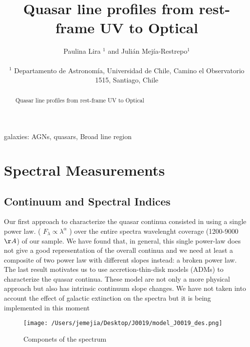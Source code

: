 \documentclass[usenatbib]{mn2e}
\begin{document}
\title[Quasar line profiles from  rest-frame UV to Optical]{Quasar line profiles from rest-frame UV to Optical}    
\author[P. Lira and J.E. Mejia-Restrepo]{
\parbox[t]{\textwidth}{\raggedright 
Paulina Lira $^{1}$ and
Juli\'an Mej\'ia-Restrepo$^{1}$ 
}
\vspace*{6pt}\\
$^{1}$ Departamento de Astronom\'{i}a, Universidad de Chile, Camino el
Observatorio 1515, Santiago, Chile} 

\maketitle

\begin{abstract}
 Quasar line profiles from  rest-frame UV to Optical 
\end{abstract}

\begin{keywords}
{galaxies: AGNs, quasars, Broad line region} 
\end{keywords}


\section{Spectral Measurements}

\subsection{Continuum and Spectral Indices}

Our first approach to characterize the quasar continua consisted in using a single power law. ( $F_{\lambda} \propto \lambda^{\alpha}$ ) over the entire spectra wavelenght coverage (1200-9000$\AA$) of our sample. We have found that, in general, this single power-law does not give a good representation of the overall continua and we need  at least a composite of two power law with different slopes instead: a broken power law.
The last result motivates us to use accretion-thin-disk models (ADMs) to  characterize the quasar continua.  These model are not only a more physical approach but also has intrinsic continuum slope changes. We have not taken into account the effect of galactic extinction on the spectra but it is being implemented in this moment

\begin{figure*}
\begin{center}
\texttt{[image: /Users/jemejia/Desktop/J0019/model\_J0019\_des.png]}
\vspace{5mm}
\end{center} 
\caption{Componets of the spectrum \label{fig:landscape}}   
\end{figure*}
\end{document}
